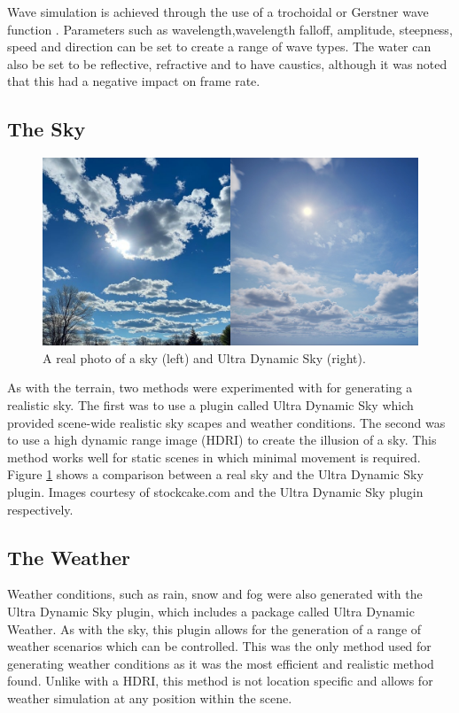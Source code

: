 \documentclass[10pt,twocolumn,letterpaper]{article}
\begin{document}
Wave simulation is achieved through the use of a trochoidal or Gerstner wave function \cite{constantin2017gerstner}. Parameters such as wavelength,wavelength falloff, amplitude, steepness, speed and direction can be set to create a range of wave types. The water can also be set to be reflective, refractive and to have caustics, although it was noted that this had a negative impact on frame rate. 

\subsection{The Sky}

\begin{figure}[t]
    \centering
    \includegraphics[width=\linewidth]{images/sky_comparison.png}
    \caption{A real photo of a sky (left) and Ultra Dynamic Sky (right).}
    \label{fig:sky_comparison}
\end{figure}

As with the terrain, two methods were experimented with for generating a realistic sky. The first was to use a plugin called Ultra Dynamic Sky \cite{UltraDynamicSky} which provided scene-wide realistic sky scapes and weather conditions. The second was to use a high dynamic range image (HDRI) to create the illusion of a sky. This method works well for static scenes in which minimal movement is required. Figure \ref{fig:sky_comparison} shows a comparison between a real sky and the Ultra Dynamic Sky plugin. Images courtesy of stockcake.com \cite{StockCake2025} and the Ultra Dynamic Sky plugin respectively.

\subsection{The Weather}

Weather conditions, such as rain, snow and fog were also generated with the Ultra Dynamic Sky plugin, which includes a package called Ultra Dynamic Weather. As with the sky, this plugin allows for the generation of a range of weather scenarios which can be controlled. This was the only method used for generating weather conditions as it was the most efficient and realistic method found. Unlike with a HDRI, this method is not location specific and allows for weather simulation at any position within the scene.
\end{document}
